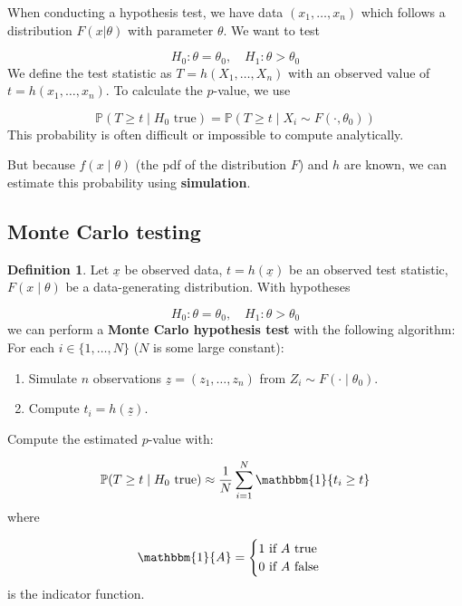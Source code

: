 \documentclass[12pt,a4paper]{article}
\theoremstyle{definition}
\newtheorem{definition}{Definition}[subsection]
\begin{document}
When conducting a hypothesis test, we have data $(x_1, \dots, x_n)$ which follows a distribution $F(x | \theta)$ with parameter $\theta$. We want to test

\[ H_0: \theta = \theta_0, \quad H_1: \theta > \theta_0 \]
We define the test statistic as $T = h(X_1, \dots, X_n)$ with an observed value of $t = h(x_1, \dots, x_n)$. To calculate the $p$-value, we use

\[ \mathbb{P}(T \ge t \mid H_0 \text{ true}) = \mathbb{P}(T \ge t \mid X_i \sim F(\cdot, \theta_0)) \]
This probability is often difficult or impossible to compute analytically.

But because $f(x \mid \theta)$ (the pdf of the distribution $F$) and $h$ are known, we can estimate this probability using \textbf{simulation}.

\subsection{Monte Carlo testing}

\begin{definition}
	Let $\underline{x}$ be observed data, $t = h(\underline{x})$ be an observed test statistic, $F(x \mid \theta)$ be a data-generating distribution. With hypotheses

	\[ H_0: \theta = \theta_0, \quad H_1: \theta > \theta_0 \]
	we can perform a \textbf{Monte Carlo hypothesis test} with the following algorithm:\\

	For each $i \in \{1, \dots, N\}$ ($N$ is some large constant):
	\begin{enumerate}
		\item Simulate $n$ observations $\underline{z} = (z_1, \dots, z_n)$ from $Z_i \sim F(\cdot \mid \theta_0)$.
		\item Compute $t_i = h(\underline{z})$.
	\end{enumerate}
	Compute the estimated $p$-value with:

	\[ \mathbb{P}(T \ge t \mid H_0 \text{ true}) \approx \frac{1}{N} \sum_{i = 1}^N \mathbbm{1}\{ t_i \ge t \} \]
	where
	
	\[ \mathbbm{1} \{ A \} = \begin{cases}
		1 \text{ if } A \text{ true}\\
		0 \text{ if } A \text{ false}
	\end{cases} \]
	is the indicator function.
\end{definition}
\end{document}
